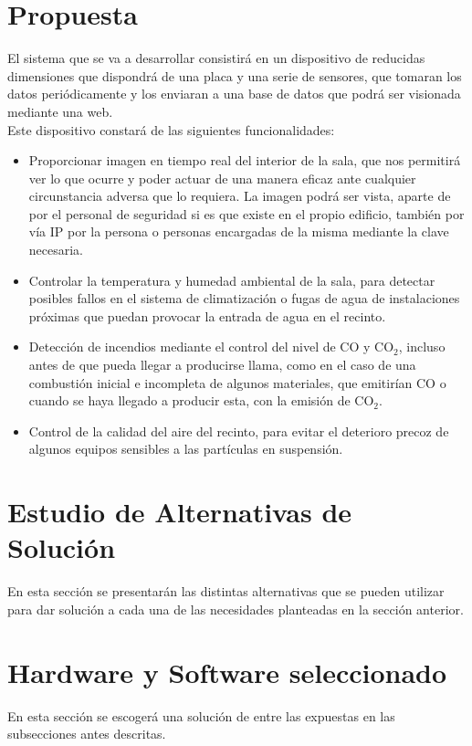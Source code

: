 \section{Propuesta}
El sistema que se va a desarrollar consistirá en un dispositivo de reducidas dimensiones que dispondrá de una placa y una serie de sensores, que tomaran los datos periódicamente y los enviaran a una base de datos que podrá ser visionada mediante una web. \\ Este dispositivo constará de las siguientes funcionalidades:
\begin{itemize}
	\item Proporcionar imagen en tiempo real del interior de la sala, que nos permitirá ver lo que ocurre y poder actuar de una manera eficaz ante cualquier circunstancia adversa que lo requiera. La imagen podrá ser vista, aparte de por el personal de seguridad si es que existe en el propio edificio, también por vía IP por la persona o personas encargadas de la misma mediante la clave necesaria.
	\item Controlar la temperatura y humedad ambiental de la sala, para detectar posibles fallos en el sistema de climatización o fugas de agua de instalaciones próximas que puedan provocar la entrada de agua en el recinto.
	\item Detección de incendios mediante el control del nivel de CO y CO$_2$, incluso antes de que pueda llegar a producirse llama, como en el caso de una combustión inicial e incompleta de algunos materiales, que emitirían CO o cuando se haya llegado a producir esta, con la emisión de CO$_2$.
	\item Control de la calidad del aire del recinto, para evitar el deterioro precoz de algunos equipos sensibles a las partículas en suspensión.
\end{itemize}

\section{Estudio de Alternativas de Solución}
\noindent En esta sección se presentarán las distintas alternativas que se pueden utilizar para dar solución a cada una de las necesidades planteadas en la sección anterior.

\section{Hardware y Software seleccionado}
\noindent En esta sección se escogerá una solución de entre las expuestas en las subsecciones antes descritas.